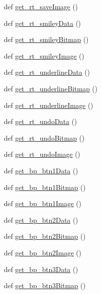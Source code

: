 \begin{DoxyCompactItemize}
\item 
def \hyperlink{namespaceimages_ac74de0ec00f14235b98b1398783e6f5f}{get\+\_\+rt\+\_\+save\+Image} ()
\item 
def \hyperlink{namespaceimages_ab452e2b655beaf7b1c1f5d07e28913ad}{get\+\_\+rt\+\_\+smiley\+Data} ()
\item 
def \hyperlink{namespaceimages_ac352cdc1b61543c7ee9b2b9b8819c34c}{get\+\_\+rt\+\_\+smiley\+Bitmap} ()
\item 
def \hyperlink{namespaceimages_a80f5f18c45716de64354e8a3cd06e245}{get\+\_\+rt\+\_\+smiley\+Image} ()
\item 
def \hyperlink{namespaceimages_a016500491499878fd6993077288fadc0}{get\+\_\+rt\+\_\+underline\+Data} ()
\item 
def \hyperlink{namespaceimages_a4bac511a6eeeb2127ebac98d0dcd14e0}{get\+\_\+rt\+\_\+underline\+Bitmap} ()
\item 
def \hyperlink{namespaceimages_ac79f659a15f37cc800164b1aa57da45a}{get\+\_\+rt\+\_\+underline\+Image} ()
\item 
def \hyperlink{namespaceimages_a9c965a0dce12c259b4545a995e0c4b73}{get\+\_\+rt\+\_\+undo\+Data} ()
\item 
def \hyperlink{namespaceimages_add871bca6a3a5a6fca4e6be7a078e0db}{get\+\_\+rt\+\_\+undo\+Bitmap} ()
\item 
def \hyperlink{namespaceimages_a7aac75ffcce6d5a3ebe9637e743169c7}{get\+\_\+rt\+\_\+undo\+Image} ()
\item 
def \hyperlink{namespaceimages_a1abc60ad61025fe5c4e73413d2d60281}{get\+\_\+bp\+\_\+btn1\+Data} ()
\item 
def \hyperlink{namespaceimages_a8ad1325727a339e62cd7c2c882c6bb55}{get\+\_\+bp\+\_\+btn1\+Bitmap} ()
\item 
def \hyperlink{namespaceimages_a6ad3dea5ab1384aff783408f19431425}{get\+\_\+bp\+\_\+btn1\+Image} ()
\item 
def \hyperlink{namespaceimages_a2ce23ab5c8c0b632222e3dc118dbd0af}{get\+\_\+bp\+\_\+btn2\+Data} ()
\item 
def \hyperlink{namespaceimages_a8b7d328c57d8752b5d6a5a65a60da1f4}{get\+\_\+bp\+\_\+btn2\+Bitmap} ()
\item 
def \hyperlink{namespaceimages_ada672f222565a1316fb9e187f9647f6a}{get\+\_\+bp\+\_\+btn2\+Image} ()
\item 
def \hyperlink{namespaceimages_ab1f0d8c363fbca669998deb88699c3d6}{get\+\_\+bp\+\_\+btn3\+Data} ()
\item 
def \hyperlink{namespaceimages_a4f4cb6eb620070ef37c962ae6c43c418}{get\+\_\+bp\+\_\+btn3\+Bitmap} ()

\end{DoxyCompactItemize}
